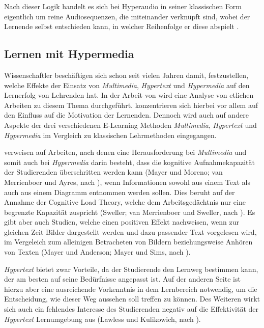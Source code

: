 Nach dieser Logik handelt es sich bei Hyperaudio in seiner klassischen Form eigentlich um reine Audiosequenzen, die miteinander verknüpft sind, wobei der Lernende selbst entschieden kann, in welcher Reihenfolge er diese abspielt \citep{zumbach2006learning}.


\subsection{Lernen mit Hypermedia}
Wissenschaftler beschäftigen sich schon seit vielen Jahren damit, festzustellen, welche Effekte der Einsatz von \textit{Multimedia}, \textit{Hypertext} und \textit{Hypermedia} auf den Lernerfolg von Lehrenden hat. In der Arbeit von \cite{moos2010multimedia} wird eine Analyse von etlichen Arbeiten zu diesem Thema durchgeführt. \cite{moos2010multimedia} konzentrieren sich hierbei vor allem auf den Einfluss auf die Motivation der Lernenden. Dennoch wird auch auf andere Aspekte der drei verschiedenen E-Learning Methoden \textit{Multimedia}, \textit{Hypertext} und  \textit{Hypermedia} im Vergleich zu klassischen Lehrmethoden eingegangen.

\cite{moos2010multimedia} verweisen auf Arbeiten, nach denen eine Herausforderung bei \textit{Multimedia} und somit auch bei \textit{Hypermedia} darin besteht, dass die kognitive Aufnahmekapazität der Studierenden überschritten werden kann (Mayer und Moreno; van Merrienboer und Ayres, nach \cite{moos2010multimedia}), wenn Informationen sowohl aus einem Text als auch aus einem Diagramm entnommen werden sollen. Dies beruht auf der Annahme der Cognitive Load Theory, welche dem Arbeitsgedächtnis nur eine begrenzte Kapazität zuspricht (Sweller; van Merrienboer und Sweller, nach \cite{moos2010multimedia}). Es gibt aber auch Studien, welche einen positiven Effekt nachweisen, wenn zur gleichen Zeit Bilder dargestellt werden und dazu passender Text vorgelesen wird, im Vergeleich zum alleinigen Betracheten von Bildern beziehungsweise Anhören von Texten (Mayer und Anderson; Mayer und Sims, nach \cite{moos2010multimedia}).

\textit{Hypertext} bietet zwar Vorteile, da der Studierende den Lernweg bestimmen kann, der am besten auf seine Bedürfnisse angepasst ist. Auf der anderen Seite ist hierzu aber eine ausreichende Vorkenntnis in dem Lernbereich notwendig, um die Entscheidung, wie dieser Weg aussehen soll treffen zu können. Des Weiteren wirkt sich auch ein fehlendes Interesse des Studierenden negativ auf die Effektivität der \textit{Hypertext} Lernumgebung aus (Lawless und Kulikowich, nach \cite{moos2010multimedia}).

